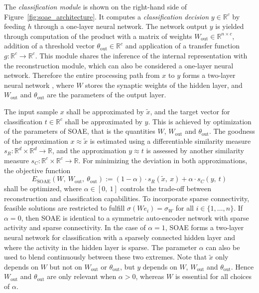 \documentclass[twoside,11pt]{article}
\DeclareMathOperator{\SOAE}{SOAE}
\DeclareMathOperator{\out}{out}
\newcommand{\intervalcc}[2]{\left[#1,\ #2\right]}
\newcommand{\R}{\mathbb{R}}
\newcommand{\0}{\mathcal{O}}
\newcommand{\discint}[2]{\{#1,\dotsc,#2\}}
\newcommand{\inint}[2]{\in\discint{#1}{#2}}
\begin{document}
The \emph{classification module} is shown on the right-hand side of Figure~\ref{fig:soae_architecture}.
It computes a \emph{classification decision} $y\in\R^c$ by feeding $h$ through a one-layer neural network.
The network output $y$ is yielded through computation of the product with a matrix of weights $W_{\out}\in\R^{n\times c}$, addition of a threshold vector $\theta_{\out}\in\R^c$ and application of a transfer function $g\colon\R^c\to\R^c$.
This module shares the inference of the internal representation with the reconstruction module, which can also be considered a one-layer neural network.
Therefore the entire processing path from $x$ to $y$ forms a two-layer neural network \citep{Rumelhart1986}, where $W$ stores the synaptic weights of the hidden layer, and $W_{\out}$ and $\theta_{\out}$ are the parameters of the output layer.

The input sample $x$ shall be approximated by $\tilde{x}$, and the target vector for classification $t\in\R^c$ shall be approximated by $y$.
This is achieved by optimization of the parameters of SOAE, that is the quantities $W$, $W_{\out}$ and $\theta_{\out}$.
The goodness of the approximation $x\approx\tilde{x}$ is estimated using a differentiable similarity measure $s_R\colon\R^d\times\R^d\to\R$, and the approximation $y\approx t$ is assessed by another similarity measure $s_C\colon\R^c\times\R^c\to\R$.
For minimizing the deviation in both approximations, the objective function
\begin{displaymath}
  E_{\SOAE}\left(W,\ W_{\out},\ \theta_{\out}\right) := \left(1 - \alpha\right)\cdot s_R\left(\tilde{x},\ x\right) + \alpha\cdot s_C\left(y,\ t\right)
\end{displaymath}
shall be optimized, where $\alpha\in\intervalcc{0}{1}$ controls the trade-off between reconstruction and classification capabilities.
To incorporate sparse connectivity, feasible solutions are restricted to fulfill $\sigma(We_i) = \sigma_W$ for all $i\inint{1}{n}$.
If $\alpha = 0$, then SOAE is identical to a symmetric auto-encoder network with sparse activity and sparse connectivity.
In the case of $\alpha = 1$, SOAE forms a two-layer neural network for classification with a sparsely connected hidden layer and where the activity in the hidden layer is sparse.
The parameter $\alpha$ can also be used to blend continuously between these two extremes.
Note that $\tilde{x}$ only depends on $W$ but not on $W_{\out}$ or $\theta_{\out}$, but $y$ depends on $W$, $W_{\out}$ and $\theta_{\out}$.
Hence $W_{\out}$ and $\theta_{\out}$ are only relevant when $\alpha > 0$, whereas $W$ is essential for all choices of $\alpha$.
\end{document}
